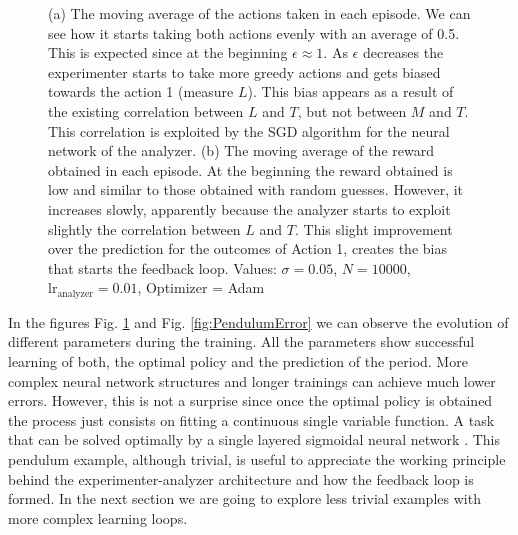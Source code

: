 \documentclass[11pt,a4paper,twoside]{report}
\newcommand{\+}{\textnormal{+} }
\theoremstyle{definition}
\numberwithin{equation}{chapter}
\begin{document}
\begin{figure}[h]
  \caption{(a) The moving average of the actions taken in each episode. We can
  see how it starts taking both actions evenly with an average of 0.5. This is
  expected since at the beginning $\epsilon \approx 1$. As $\epsilon$ decreases
  the experimenter starts to take more greedy actions and gets biased towards
  the action 1 (measure $L$). This bias appears as a result of the existing
  correlation between $L$ and $T$, but not between $M$ and $T$. This correlation
  is exploited by the SGD algorithm for the neural network of the analyzer. (b)
  The moving average of the reward obtained in each episode. At the beginning
  the reward obtained is low and similar to those obtained with random guesses.
  However, it increases slowly, apparently because the analyzer starts to
  exploit slightly the correlation between $L$ and $T$. This slight improvement
  over the prediction for the outcomes of Action 1, creates the bias that starts
  the feedback loop. Values: $\sigma=0.05$, $N=10000$,
  $\text{lr}_\text{analyzer}=0.01$, Optimizer = Adam}
  \label{fig:PendulumTraining}
  \end{figure}

  In the figures Fig. \ref{fig:PendulumTraining} and Fig.
  \ref{fig:PendulumError} we can observe the evolution of different parameters
  during the training. All the parameters show successful learning of both, the
  optimal policy and the prediction of the period. More complex neural network
  structures and longer trainings can achieve much lower errors. However, this
  is not a surprise since once the optimal policy is obtained the process just
  consists on fitting a continuous single variable function. A task that can be
  solved optimally by a single layered sigmoidal neural network
  \cite{cybenko1989approximation}. This pendulum example, although trivial, is
  useful to appreciate the working principle behind the experimenter-analyzer
  architecture and how the feedback loop is formed. In the next section we are
  going to explore less trivial examples with more complex learning loops.
\end{document}
